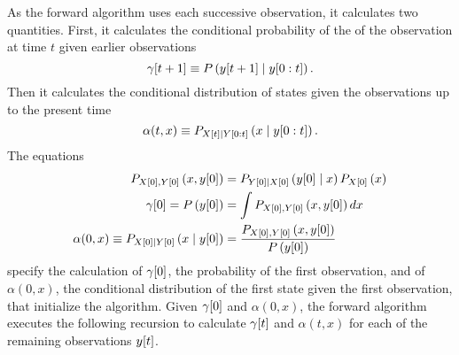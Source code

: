 As the forward algorithm uses each successive observation, it
calculates two quantities.  First, it calculates the conditional
probability of the of the observation at time $t$ given earlier
observations
\begin{equation*}
  {\gamma}{[t+1]} \equiv P\left({y}{[t+1]}\mid y[0:t] \right).
\end{equation*}
Then it calculates the conditional distribution of states given the
observations up to the present time
\begin{equation*}
  \alpha(t,x) \equiv P_{{X}{[t]}\mid Y[0:t]} \left(x\mid y[0:t]
  \right).
\end{equation*}
The equations
\begin{align}
  \label{eq:ContInitial}
  P_{{X}{[0]},{Y}{[0]}} \left(x,{y}{[0]} \right) &=
  P_{{Y}{[0]}\mid {X}{[0]}} \left({y}{[0]}\mid x \right)P_{{X}{[0]}}
  \left(x \right) \\
  {\gamma}{[0]} = P\left({y}{[0]} \right) & = \int
  P_{{X}{[0]},{Y}{[0]}}
  \left(x,{y}{[0]} \right) dx \\
  \alpha(0,x) \equiv P_{{X}{[0]}\mid {Y}{[0]}} \left(x\mid {y}{[0]} \right) &=
  \frac{P_{{X}{[0]},{Y}{[0]}} \left(x,{y}{[0]}
    \right)}{P\left({y}{[0]} \right)}
\end{align}
specify the calculation of ${\gamma}{[0]}$, the probability of the first
observation, and of $\alpha(0,x)$, the conditional distribution of the
first state given the first observation, that initialize the
algorithm.  Given ${\gamma}{[0]}$ and $\alpha(0,x)$, the forward algorithm
executes the following recursion to calculate ${\gamma}{[t]}$ and
$\alpha(t,x)$ for each of the remaining observations ${y}{[t]}$.
